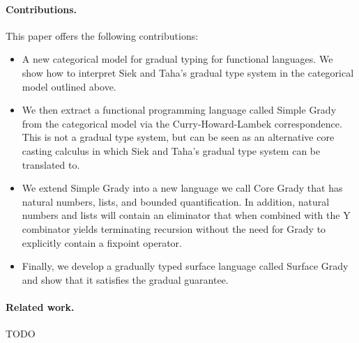 \paragraph{Contributions.} This paper offers the following contributions:
\begin{itemize}

\item A new categorical model for gradual typing for functional
  languages.  We show how to interpret Siek and Taha's
  \cite{Siek:2015} gradual type system in the categorical model
  outlined above.  

\item We then extract a functional programming language called Simple
  Grady from the categorical model via the Curry-Howard-Lambek
  correspondence.  This is not a gradual type system, but can be seen
  as an alternative core casting calculus in which Siek and Taha's
  gradual type system can be translated to.
  
\item We extend Simple Grady into a new language we call Core Grady that
  has natural numbers, lists, and bounded quantification. In addition,
  natural numbers and lists will contain an eliminator that when
  combined with the Y combinator yields terminating recursion without
  the need for Grady to explicitly contain a fixpoint operator.

\item Finally, we develop a gradually typed surface language called
  Surface Grady and show that it satisfies the gradual guarantee.

\end{itemize}

\paragraph{Related work.} TODO

